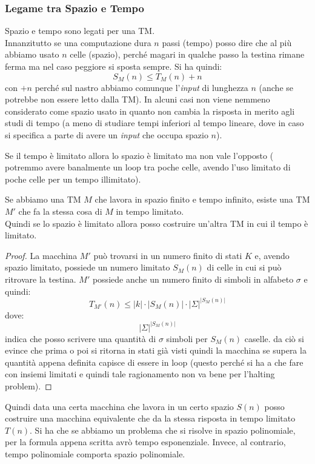 \subsubsection{Legame tra Spazio e Tempo}
Spazio e tempo sono legati per una TM.\\
Innanzitutto se una computazione dura $n$ passi (tempo) posso dire che al più abbiamo
usato $n$ celle (spazio), perché magari in qualche passo la testina rimane ferma
ma nel caso peggiore si sposta sempre. Si ha quindi:
\[S_M(n)\leq T_M(n)+n\]
con $+n$ perché sul nastro abbiamo comunque l'\textit{input} di lunghezza $n$ (anche se
potrebbe non essere letto dalla TM). In alcuni casi non viene nemmeno
considerato come spazio usato in quanto non cambia la risposta in merito agli
studi di tempo (a meno di studiare tempi inferiori al tempo lineare, dove in
caso si specifica a parte di avere un \textit{input} che occupa spazio $n$).
\begin{definizione}
  Se il tempo è limitato allora lo spazio è limitato ma non vale l'opposto
  ( potremmo avere banalmente un loop tra poche celle, avendo l'uso limitato di
  poche celle per un tempo illimitato).
\end{definizione}
\begin{definizione}
  Se abbiamo una TM $M$ che lavora in spazio finito e tempo infinito, esiste una TM
  $M'$ che fa la stessa cosa di $M$ in tempo limitato.\\
  Quindi se lo spazio è limitato allora posso costruire un'altra TM in cui il tempo è limitato.
\end{definizione}
\begin{proof}
  La macchina $M'$ può trovarsi in un numero finito di stati $K$ e, avendo spazio limitato, possiede un numero limitato $S_M(n)$ di celle in cui si può ritrovare la testina. $M'$ possiede anche un numero finito di simboli in alfabeto $\sigma$ e quindi: 
  \[T_{M'}(n)\leq|k|\cdot |S_M(n)|\cdot |\Sigma|^{|S_M(n)|}\]
  dove:   \[ |\Sigma|^{|S_M(n)|} \] indica che posso scrivere una quantità di $\sigma$ simboli per $S_M(n)$ caselle.
  da ciò si evince che prima o poi si ritorna in stati già visti quindi la macchina se supera
  la quantità appena definita capisce di essere in loop (questo perché si ha a
  che fare con insiemi limitati e quindi tale ragionamento non va bene per
  l'halting problem).
\end{proof}
Quindi data una certa macchina che lavora in un certo spazio $S(n)$ posso
costruire una macchina equivalente che da la stessa risposta in tempo limitato
$T(n)$. Si ha che se abbiamo un problema che si risolve in spazio polinomiale, per
la formula appena scritta avrò tempo esponenziale. Invece, al contrario, tempo
polinomiale comporta spazio polinomiale.
